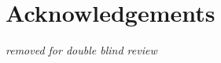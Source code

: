 \documentclass[10pt,times,numbers]{../sigplanconf}
\begin{document}






\section{Acknowledgements}

{\em removed for double blind review}


{}
\end{document}

